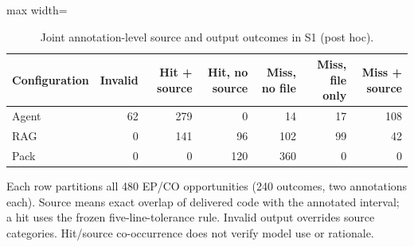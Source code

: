\begin{table}[t]
\centering\small
\caption{Joint annotation-level source and output outcomes in S1 (post hoc).}\label{tab:annotation-stages}
\begin{adjustbox}{max width=\textwidth}\begin{tabular}{lrrrrrr}
\toprule
Configuration & Invalid & Hit + source & Hit, no source & Miss, no file & Miss, file only & Miss + source \\
\midrule
Agent & 62 & 279 & 0 & 14 & 17 & 108 \\
RAG & 0 & 141 & 96 & 102 & 99 & 42 \\
Pack & 0 & 0 & 120 & 360 & 0 & 0 \\
\bottomrule
\end{tabular}\end{adjustbox}
\par\vspace{3pt}\begin{minipage}{\textwidth}\footnotesize Each row partitions all 480 EP/CO opportunities (240 outcomes, two annotations each). Source means exact overlap of delivered code with the annotated interval; a hit uses the frozen five-line-tolerance rule. Invalid output overrides source categories. Hit/source co-occurrence does not verify model use or rationale.\end{minipage}
\end{table}
